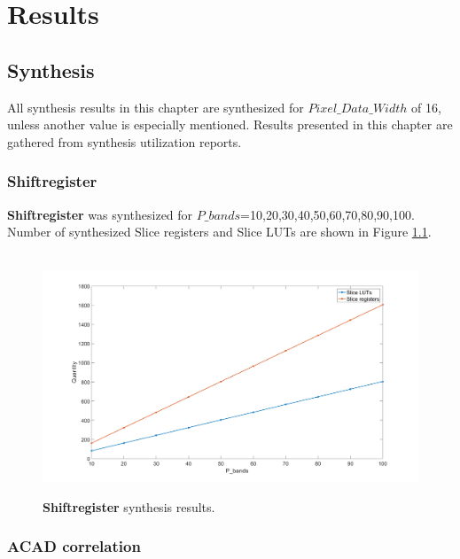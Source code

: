 \newpage
\chapter{Results}
\label{sec:results}
\section{Synthesis}
\label{sec:synthesis_results}
All synthesis results in this chapter are synthesized for $Pixel\_Data\_Width$ of 16, unless another value is 
especially mentioned. Results presented in this chapter are gathered from synthesis utilization reports.
\subsection{Shiftregister}
\textbf{Shiftregister} was synthesized for $P\_bands$=10,20,30,40,50,60,70,80,90,100. Number of synthesized Slice registers and Slice LUTs are shown in Figure \ref{fig:primitives_shiftregister}. 

\begin{figure}[H]

\hbox{\hspace*{-2cm}                                                           
   \includegraphics[scale=0.3]{images/syntese_resultat/shiftregister.png}}
  \caption{\textbf{Shiftregister} synthesis results.  } 
  \label{fig:primitives_shiftregister}
\end{figure}

\subsection{ACAD correlation}

